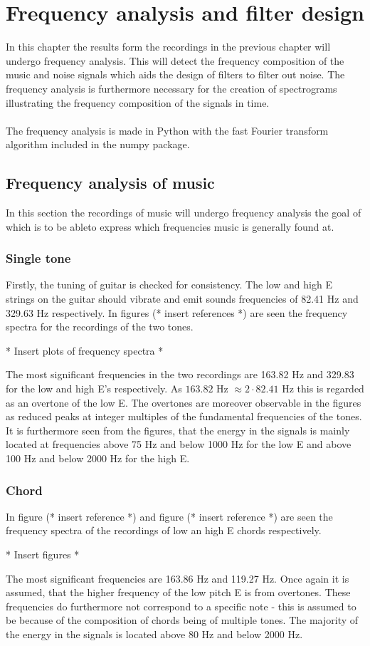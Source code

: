 \chapter{Frequency analysis and filter design}
In this chapter the results form the recordings in the previous chapter will undergo frequency analysis. This will detect the frequency composition of the music and noise signals which aids the design of filters to filter out noise. The frequency analysis is furthermore necessary for the creation of spectrograms illustrating the frequency composition of the signals in time.\\\\
The frequency analysis is made in Python with the fast Fourier transform algorithm included in the numpy package.
\section{Frequency analysis of music}
In this section the recordings of music will undergo frequency analysis the goal of which is to be ableto express which frequencies music is generally found at.
\subsection{Single tone}
Firstly, the tuning of guitar is checked for consistency. The low and high E strings on the guitar should vibrate and emit sounds frequencies of 82.41 Hz and 329.63 Hz respectively. In figures (* insert references *) are seen the frequency spectra for the recordings of the two tones.
\begin{center}
* Insert plots of frequency spectra *
\end{center}
The most significant frequencies in the two recordings are 163.82 Hz and 329.83 for the low and high E's respectively. As $163.82$ Hz $\approx 2\cdot82.41$ Hz this is regarded as an overtone of the low E. The overtones are moreover observable in the figures as reduced peaks at integer multiples of the fundamental frequencies of the tones. It is furthermore seen from the figures, that the energy in the signals is mainly located at frequencies above 75 Hz and below 1000 Hz for the low E and above 100 Hz and below 2000 Hz for the high E.
\subsection{Chord}
In figure (* insert reference *) and figure (* insert reference *) are seen the frequency spectra of the recordings of low an high E chords respectively.
\begin{center}
* Insert figures *
\end{center}
The most significant frequencies are 163.86 Hz and 119.27 Hz. Once again it is assumed, that the higher frequency of the low pitch E is from overtones. These frequencies do furthermore not correspond to a specific note - this is assumed to be because of the composition of chords being of multiple tones. The majority of the energy in the signals is located above 80 Hz and below 2000 Hz.
